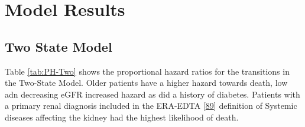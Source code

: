 \documentclass[12pt,PhD,twoside,openright]{muthesis}
\begin{document}
\hypertarget{model-results}{%
\section{Model Results}\label{model-results}}

\hypertarget{two-state-model}{%
\subsection{Two State Model}\label{two-state-model}}

Table \ref{tab:PH-Two} shows the proportional hazard ratios for the transitions in the Two-State Model. Older patients have a higher hazard towards death, low adn decreasing eGFR increased hazard as did a history of diabetes. Patients with a primary renal diagnosis included in the ERA-EDTA {[}\protect\hyperlink{ref-venkat-raman_new_2012}{89}{]} definition of Systemic diseases affecting the kidney had the highest likelihood of death.
\end{document}
